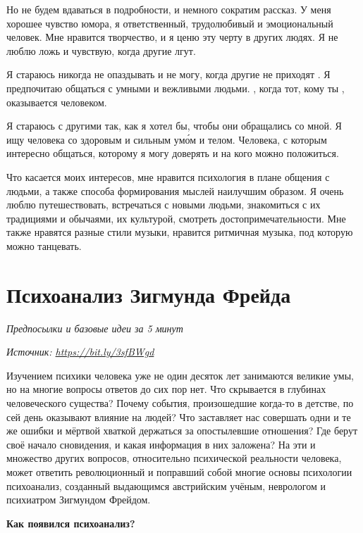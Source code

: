 Но не будем вдаваться в подробности, и немного сократим рассказ. У меня хорошее чувство юмора, я ответственный, трудолюбивый и эмоциональный человек. Мне нравится творчество, и я ценю эту черту в других людях. Я не люблю ложь и чувствую, когда другие лгут.

Я стараюсь никогда не опаздывать и  не могу, когда другие не приходят . Я предпочитаю общаться с умными и вежливыми людьми. , когда тот, кому ты , оказывается  человеком.

Я стараюсь  с другими так, как я хотел бы, чтобы они обращались со мной. Я ищу человека со здоровым и сильным ум\'{о}м и телом. Человека, с которым интересно общаться, которому я могу доверять и на кого можно положиться.

Что касается моих интересов, мне нравится психология в плане общения с людьми, а также способа формирования мыслей наилучшим образом. Я очень люблю путешествовать, встречаться с новыми людьми, знакомиться с их традициями и обычаями, их культурой, смотреть достопримечательности. Мне также нравятся разные стили музыки, нравится ритмичная музыка, под которую можно танцевать.

\newpage
\section{Психоанализ Зигмунда Фрейда}

\textit{Предпосылки и базовые идеи за 5 минут}

\textit{Источник: \url{https://bit.ly/3sfBWgd}}

Изучением психики человека уже не один десяток лет занимаются великие умы, но на многие вопросы ответов до сих пор нет. Что скрывается в глубинах человеческого существа? Почему события, произошедшие когда-то в детстве, по сей день оказывают влияние на людей? Что заставляет нас совершать одни и те же ошибки и мёртвой хваткой держаться за опостылевшие отношения? Где берут своё начало сновидения, и какая информация в них заложена? На эти и множество других вопросов, относительно психической реальности человека, может ответить революционный и поправший собой многие основы психологии психоанализ, созданный выдающимся австрийским учёным, неврологом и психиатром Зигмундом Фрейдом.

\textbf{Как появился психоанализ?}

